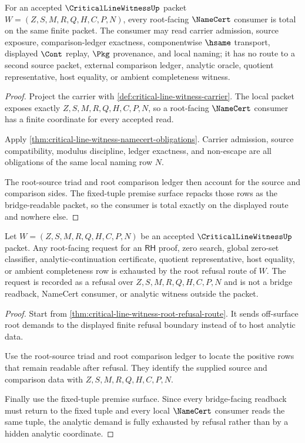 \begin{theorem}
\label{thm:critical-line-witness-root-namecert-consumer-totality}
For an accepted $\CriticalLineWitnessUp$ packet
$W=(Z,S,M,R,Q,H,C,P,N)$, every root-facing $\NameCert$ consumer is total on the
same finite packet. The consumer may read carrier admission, source exposure,
comparison-ledger exactness, componentwise $\hsame$ transport, displayed
$\Cont$ replay, $\Pkg$ provenance, and local naming; it has no route to a
second source packet, external comparison ledger, analytic oracle, quotient
representative, host equality, or ambient completeness witness.
\end{theorem}
\begin{proof}
Project the carrier with \autoref{def:critical-line-witness-carrier}. The local
packet exposes exactly $Z,S,M,R,Q,H,C,P,N$, so a root-facing $\NameCert$
consumer has a finite coordinate for every accepted read.

Apply \autoref{thm:critical-line-witness-namecert-obligations}. Carrier
admission, source compatibility, modulus discipline, ledger exactness, and
non-escape are all obligations of the same local naming row $N$.

The root-source triad and root comparison ledger then account for the source
and comparison sides. The fixed-tuple premise surface repacks those rows as the
bridge-readable packet, so the consumer is total exactly on the displayed route
and nowhere else.
\end{proof}

\begin{theorem}
\label{thm:critical-line-witness-root-analytic-refusal-exhaustion}
Let $W=(Z,S,M,R,Q,H,C,P,N)$ be an accepted $\CriticalLineWitnessUp$ packet. Any
root-facing request for an $\mathsf{RH}$ proof, zero search, global zero-set
classifier, analytic-continuation certificate, quotient representative, host
equality, or ambient completeness row is exhausted by the root refusal route of
$W$. The request is recorded as a refusal over $Z,S,M,R,Q,H,C,P,N$ and is not a
bridge readback, NameCert consumer, or analytic witness outside the packet.
\end{theorem}
\begin{proof}
Start from \autoref{thm:critical-line-witness-root-refusal-route}. It sends
off-surface root demands to the displayed finite refusal boundary instead of to
host analytic data.

Use the root-source triad and root comparison ledger to locate the positive
rows that remain readable after refusal. They identify the supplied source and
comparison data with $Z,S,M,R,Q,H,C,P,N$.

Finally use the fixed-tuple premise surface. Since every bridge-facing readback
must return to the fixed tuple and every local $\NameCert$ consumer reads the
same tuple, the analytic demand is fully exhausted by refusal rather than by a
hidden analytic coordinate.
\end{proof}
